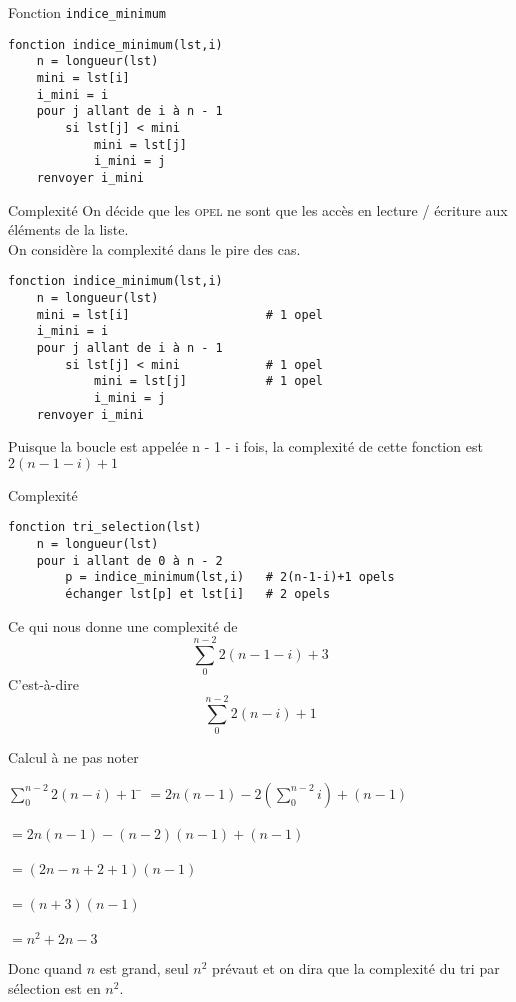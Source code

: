 \documentclass[10pt]{beamer}
\begin{document}
\begin{frame}[fragile]{Fonction \texttt{indice\_minimum}}
\begin{verbatim}
fonction indice_minimum(lst,i)
    n = longueur(lst)
    mini = lst[i]
    i_mini = i
    pour j allant de i à n - 1
        si lst[j] < mini
            mini = lst[j]
            i_mini = j
    renvoyer i_mini
\end{verbatim}
\end{frame}
\begin{frame}[fragile]{Complexité}
On décide que les \textsc{opel} ne sont que les accès en lecture / écriture aux éléments de la liste.\\
On considère la complexité dans le pire des cas.
\begin{verbatim}
fonction indice_minimum(lst,i)
    n = longueur(lst)               
    mini = lst[i]                   # 1 opel
    i_mini = i                      
    pour j allant de i à n - 1      
        si lst[j] < mini            # 1 opel
            mini = lst[j]           # 1 opel
            i_mini = j              
    renvoyer i_mini
\end{verbatim}
Puisque la boucle est appelée n - 1 - i fois, la complexité de cette fonction est $2(n-1-i)+1$
\end{frame}
\begin{frame}[fragile]{Complexité}
\small
\begin{verbatim}
fonction tri_selection(lst)
    n = longueur(lst)               
    pour i allant de 0 à n - 2      
        p = indice_minimum(lst,i)   # 2(n-1-i)+1 opels
        échanger lst[p] et lst[i]   # 2 opels
\end{verbatim}
\normalsize
Ce qui nous donne une complexité de $$\sum_{0}^{n-2} 2(n-1-i) +3$$
C'est-à-dire $$ \sum_{0}^{n-2} 2(n-i) + 1$$
\end{frame}

\begin{frame}{Calcul à ne pas noter}
\begin{tabbing}
$\sum_{0}^{n-2} 2(n-i) + 1$ \= $=2n(n-1)-2\left(\sum_{0}^{n-2}i\right) + (n-1)$\\
\\
\> $= 2n(n-1)-(n-2)(n-1)+(n-1)$\\
\\
\> $= (2n-n+2+1)(n-1)$\\
\\
\> $= (n+3)(n-1)$\\
\\
\> $= n^2+2n-3$\\
\end{tabbing}
Donc quand $n$ est grand, seul $n^2$ prévaut et on dira que la complexité du tri par sélection est en $n^2$.
\end{frame}
\end{document}
